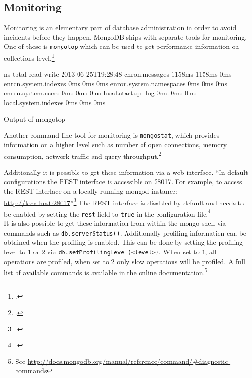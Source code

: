 \subsection{Monitoring}
\label{sec:maintenance-monitroing}
Monitoring is an elementary part of database administration in order to avoid
incidents before they happen. MongoDB ships with separate tools for monitoring.
One of these is \texttt{mongotop} which can be used to get performance information
on collections level.\footcite[Cf.][]{mongo_monitoring}
\begin{listing}
    \begin{bashcode}
                            ns       total        read       write
2013-06-25T19:28:48
                enron.messages      1158ms      1158ms         0ms
          enron.system.indexes         0ms         0ms         0ms
       enron.system.namespaces         0ms         0ms         0ms
            enron.system.users         0ms         0ms         0ms
             local.startup_log         0ms         0ms         0ms
          local.system.indexes         0ms         0ms         0ms
    \end{bashcode}
    \caption{Output of mongotop}
    \label{lst:mongotop}
\end{listing}

Another command line tool for monitoring is \texttt{mongostat}, which provides
information on a higher level such as number of open connections,
memory consumption, network traffic and query throughput.\footcite[Cf.][]{mongo_monitoring}

Additionally it is possible to get these information via a web interface.
``In default configurations the REST interface is accessible on 28017. For
example, to access the REST interface on a locally running mongod instance:
\url{http://localhost:28017}''\footcite[][]{mongo_monitoring}
The REST interface is disabled by default and needs to be enabled by setting the
\texttt{rest} field to \texttt{true} in the configuration file.\footcite[Cf.][]{mongo_conf}\\
It is also possible to get these information from within the mongo shell via commands such as
\texttt{db.serverStatus()}. Additionally profiling information can be obtained when the
profiling is enabled. This can be done by setting the profiling level to $1$ or $2$ via
\texttt{db.setProfilingLevel(<level>)}. When set to $1$, all operations are profiled, when set
to $2$ only slow operations will be profiled.
A full list of available commands is available in the online
documentation.\footnote{See \url{http://docs.mongodb.org/manual/reference/command/\#diagnostic-commands}}


